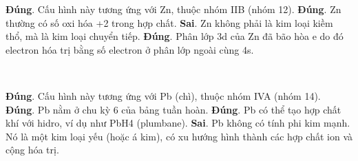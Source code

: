 \def\writeANS{\TLdung{A}\TLdung{B}\TLsai{C}\TLdung{D}}
\begin{loigiaiex}{44}
  \begin {itemchoice} \itemch \textbf {Đúng}. Cấu hình này tương ứng với Zn, thuộc nhóm IIB (nhóm 12). \itemch \textbf {Đúng}. Zn thường có số oxi hóa +2 trong hợp chất. \itemch \textbf {Sai}. Zn không phải là kim loại kiềm thổ, mà là kim loại chuyển tiếp. \itemch \textbf {Đúng}. Phân lớp 3d của Zn đã bão hòa e do đó electron hóa trị bằng số electron ở phân lớp ngoài cùng 4s. \end {itemchoice}  \phantom {a}\hfill { \faKey ~\writeANS }
\end{loigiaiex}
\def\writeANS{\TLdung{C}\TLsai{D}}
\begin{loigiaiex}{45}
  \begin {itemchoice} \itemch \textbf {Đúng}. Cấu hình này tương ứng với Pb (chì), thuộc nhóm IVA (nhóm 14). \itemch \textbf {Đúng}. Pb nằm ở chu kỳ 6 của bảng tuần hoàn. \itemch \textbf {Đúng}. Pb có thể tạo hợp chất khí với hidro, ví dụ như PbH4 (plumbane). \itemch \textbf {Sai}. Pb không có tính phi kim mạnh. Nó là một kim loại yếu (hoặc á kim), có xu hướng hình thành các hợp chất ion và cộng hóa trị. \end {itemchoice}  \phantom {a}\hfill { \faKey ~\writeANS }
\end{loigiaiex}
